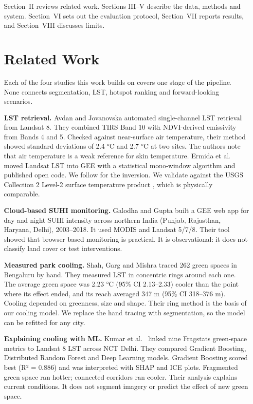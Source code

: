 \documentclass[conference]{IEEEtran}
\begin{document}
Section~II reviews related work. Sections III--V describe the data,
methods and system. Section~VI sets out the evaluation protocol,
Section~VII reports results, and Section~VIII discusses limits.

\section{Related Work}\label{related-work}

Each of the four studies this work builds on covers one stage of the
pipeline. None connects segmentation, LST, hotspot ranking and
forward-looking scenarios.

\textbf{LST retrieval.} Avdan and Jovanovska \cite{b1} automated
single-channel LST retrieval from Landsat 8. They combined TIRS Band 10
with NDVI-derived emissivity from Bands 4 and 5. Checked against
near-surface air temperature, their method showed standard deviations of
2.4 °C and 2.7 °C at two sites. The authors note that air temperature is
a weak reference for skin temperature. Ermida et al.~\cite{b5} moved
Landsat LST into GEE with a statistical mono-window algorithm and
published open code. We follow \cite{b1} for the inversion. We validate
against the USGS Collection 2 Level-2 surface temperature product
\cite{b12}, which is physically comparable.

\textbf{Cloud-based SUHI monitoring.} Galodha and Gupta \cite{b2} built
a GEE web app for day and night SUHI intensity across northern India
(Punjab, Rajasthan, Haryana, Delhi), 2003--2018. It used MODIS and
Landsat 5/7/8. Their tool showed that browser-based monitoring is
practical. It is observational: it does not classify land cover or test
interventions.

\textbf{Measured park cooling.} Shah, Garg and Mishra \cite{b3} traced
262 green spaces in Bengaluru by hand. They measured LST in concentric
rings around each one. The average green space was 2.23 °C (95\% CI
2.13--2.33) cooler than the point where its effect ended, and its reach
averaged 347 m (95\% CI 318--376 m). Cooling depended on greenness, size
and shape. Their ring method is the basis of our cooling model. We
replace the hand tracing with segmentation, so the model can be refitted
for any city.

\textbf{Explaining cooling with ML.} Kumar et al.~\cite{b4} linked nine
Fragstats green-space metrics to Landsat 8 LST across NCT Delhi. They
compared Gradient Boosting, Distributed Random Forest and Deep Learning
models. Gradient Boosting scored best (R² = 0.886) and was interpreted
with SHAP and ICE plots. Fragmented green space ran hotter; connected
corridors ran cooler. Their analysis explains current conditions. It
does not segment imagery or predict the effect of new green space.
\end{document}
